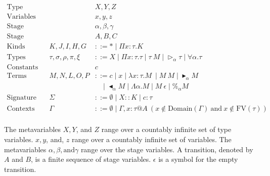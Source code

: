 \documentclass[runningheads]{llncs}
\newcommand{\G}{\Gamma}
\newcommand{\TW}{\triangleright}
\newcommand{\F}{\forall}
\newcommand{\TB}{\blacktriangleright}
\newcommand{\TBL}{\blacktriangleleft}
\begin{document}
\begin{align*}
	\textrm{Type variables}  &  &                          & X,Y,Z                                                                             \\
	\textrm{Variables}       &  &                          & x,y,z                                                                             \\
	\textrm{Stage variables} &  &                          & \alpha,\beta,\gamma                                                               \\
	\textrm{Stage}           &  &                          & A,B,C                                                                             \\
	\textrm{Kinds}           &  & K,J,I,H,G                & ::= * \mid \Pi x:\tau.K                                                           \\
	\textrm{Types}           &  & \tau,\sigma,\rho,\pi,\xi & ::= X \mid \Pi x:\tau.\tau \mid \tau\ M \mid \TW_{\alpha} \tau \mid \F\alpha.\tau \\
	\textrm{Constants}       &  &                          & c                                                                                 \\
	\textrm{Terms}           &  & M,N,L,O,P                & ::= c \mid x \mid \lambda x:\tau.M\ \mid M\ M \mid \TB_\alpha M                   \\
	                         &  &                          & \ \ \ \ \mid \TBL_\alpha M \mid \Lambda\alpha.M \mid M\ \epsilon \mid \%_\alpha M         \\  
	\textrm{Signature}       &  & \Sigma                   & ::= \emptyset \mid X::K \mid c:\tau                                               \\
	\textrm{Contexts}        &  & \Gamma                   & ::= \emptyset \mid  \Gamma,x:\tau @A\ (x\not\in\textrm{Domain}(\G)\ \text{and}\ x\not\in\textrm{FV}(\tau))               \\
\end{align*}


The metavariables $X, Y$, and $Z$ range over a countably infinite set of type variables.
$x, y$, and, $z$ range over a countably infinite set of variables.
The metavariables $\alpha, \beta, \text{and} \gamma$ range over the stage variables.
A transition, denoted by $A$ and $B$, is a finite sequence of stage variables.
$\epsilon$ is a symbol for the empty transition.
\end{document}
